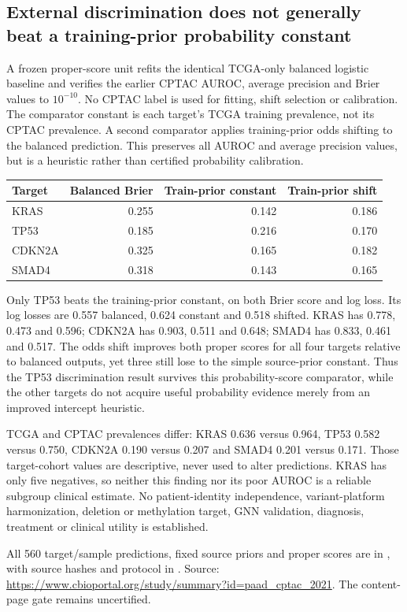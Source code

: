 \subsection{External discrimination does not generally beat a training-prior probability constant}
A frozen proper-score unit refits the identical TCGA-only balanced logistic baseline and verifies the earlier CPTAC AUROC, average precision and Brier values to $10^{-10}$. No CPTAC label is used for fitting, shift selection or calibration. The comparator constant is each target's TCGA training prevalence, not its CPTAC prevalence. A second comparator applies training-prior odds shifting to the balanced prediction. This preserves all AUROC and average precision values, but is a heuristic rather than certified probability calibration.

\begin{center}
\begin{tabular}{lrrr}
\hline
Target & Balanced Brier & Train-prior constant & Train-prior shift \\
\hline
KRAS & 0.255 & 0.142 & 0.186 \\
TP53 & 0.185 & 0.216 & 0.170 \\
CDKN2A & 0.325 & 0.165 & 0.182 \\
SMAD4 & 0.318 & 0.143 & 0.165 \\
\hline
\end{tabular}
\end{center}
Only TP53 beats the training-prior constant, on both Brier score and log loss. Its log losses are 0.557 balanced, 0.624 constant and 0.518 shifted. KRAS has 0.778, 0.473 and 0.596; CDKN2A has 0.903, 0.511 and 0.648; SMAD4 has 0.833, 0.461 and 0.517. The odds shift improves both proper scores for all four targets relative to balanced outputs, yet three still lose to the simple source-prior constant. Thus the TP53 discrimination result survives this probability-score comparator, while the other targets do not acquire useful probability evidence merely from an improved intercept heuristic.

TCGA and CPTAC prevalences differ: KRAS 0.636 versus 0.964, TP53 0.582 versus 0.750, CDKN2A 0.190 versus 0.207 and SMAD4 0.201 versus 0.171. Those target-cohort values are descriptive, never used to alter predictions. KRAS has only five negatives, so neither this finding nor its poor AUROC is a reliable subgroup clinical estimate. No patient-identity independence, variant-platform harmonization, deletion or methylation target, GNN validation, diagnosis, treatment or clinical utility is established.

All 560 target/sample predictions, fixed source priors and proper scores are in , with source hashes and protocol in . Source: \url{https://www.cbioportal.org/study/summary?id=paad_cptac_2021}. The content-page gate remains uncertified.
